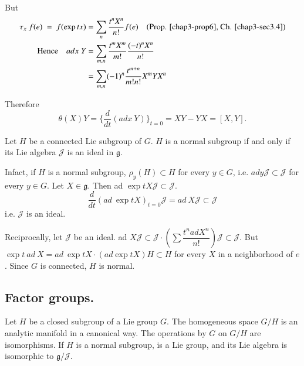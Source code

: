 But
\begin{align*}
\tau_x~f(e)~=~f(\exp tx) & =\sum\limits_{n}\frac{t^n
  X^n}{n!}f(e)\quad \text{(Prop. \ref{chap3-prop6}, Ch. \ref{chap3-sec3.4})}\\
\text{Hence}\quad   adx ~Y & = \sum\limits_{m,n} \frac{t^m X^m}{m!}
\frac{(-t)^nX^n}{n!}\\ 
&  = \sum\limits_{m,n} (-1)^n\frac{t^{m+n}}{m!n!}X^m Y X^n
\end{align*}

Therefore 
$$
\theta (X)Y= \{\dfrac{d}{dt}(adx~ Y)\}_{t=0} = XY-YX=[X,Y].
$$

\begin{coro*}%
 Let $H$ be a connected Lie subgroup of $G$. $H$ is a normal subgroup
 if and only if its Lie algebra $\mathscr{J}$ is an ideal in
 $\mathfrak{g}$. 
\end{coro*}

In\pageoriginale fact, if $H$ is a normal subgroup, $\rho_y(H)\subset
H$  for every  $y \in G$, i.e. $ady \mathscr{J} \subset \mathscr{J}$  for
every $y \in G$. Let $X \in \mathfrak{g}$. Then ad $\exp t X
\mathscr{J} \subset \mathscr{J}$. 
$$
\dfrac{d}{dt} (ad~\exp tX)_{t=0} \mathscr{J} = ad~X \mathscr{J}\subset
 \mathscr{J} 
$$ 
i.e. $\mathscr{J}$ is an ideal.

Reciprocally, let $\mathscr{J}$ be an ideal. ad $X \mathscr{J}\subset
\mathscr{J}\cdot (\sum \dfrac{t^nad X^n}{n!}) \mathscr{J} \subset
\mathscr{J}$. 
But $\exp t\ ad\ X =ad\ \exp tX\cdot (ad \exp tX) H \subset H$ for every
$X$ in a neighborhood of $e$. Since $G$ is connected, $H$ is normal.  

\subsection{Factor groups.}\label{chap4-sec4.8}%

\begin{thm}\label{chap4-thm6}%
 Let $H$ {be a closed subgroup of a Lie group} $G$. {The homogeneous
   space $G/H$ is an analytic manifold in a canonical way}. {The
   operations by} $G$ on $G/H$ are isomorphisms. If $H$ is a normal
 subgroup, is a Lie group, and its Lie algebra is
   isomorphic to $\mathfrak{g}/\mathscr{J}$. 
\end{thm}

